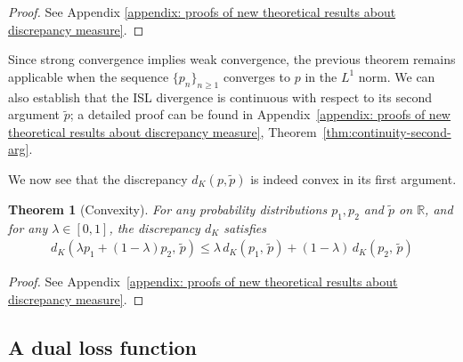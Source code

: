 \documentclass{article}
\newtheorem{theorem}{Theorem}[section]
\begin{document}
\begin{proof}
    See Appendix \ref{appendix: proofs of new theoretical results about discrepancy measure}. 
\end{proof}

Since strong convergence implies weak convergence, the previous theorem remains applicable when the sequence $\{p_n\}_{n\geq 1}$ converges to $p$ in the $L^1$ norm. We can also establish that the ISL divergence is continuous with respect to its second argument $\tilde{p}$; a detailed proof can be found in Appendix~\ref{appendix: proofs of new theoretical results about discrepancy measure}, Theorem~\ref{thm:continuity-second-arg}.

We now see that the discrepancy $d_{K}(p,\tilde{p})$ is indeed convex in its first argument.
\begin{theorem}[Convexity] \label{Theorem: Convexity in the First Argument}
    For any probability distributions $p_1, p_2$ and $\tilde{p}$ on $\mathbb{R}$, and for any $\lambda \in [0, 1]$, the discrepancy $d_{K}$ satisfies
    \begin{align*}
    d_{K}(\lambda p_1 + (1 - \lambda) p_2, \, \tilde{p}) \leq \lambda \, d_{K}(p_1, \, \tilde{p}) + (1 - \lambda)\, d_{K}(p_2, \, \tilde{p})
    \end{align*}
\end{theorem}

\begin{proof}
    See Appendix~\ref{appendix: proofs of new theoretical results about discrepancy measure}.
\end{proof}

\subsection{A dual loss function}

\end{document}
